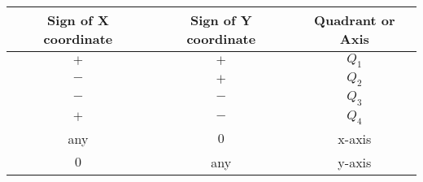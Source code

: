 \begin{tabular}[12pt]{ |c| c| c|} 
    \hline
    {Sign of X coordinate} & {Sign of Y coordinate} & {Quadrant or Axis}\\ 
    \hline
    $ + $ & $ + $ & $ Q_1 $\\
    \hline 
    $ - $ & $ + $ & $ Q_2 $ \\
    \hline
    $ - $ & $ - $ & $ Q_3 $ \\
    \hline   
    $ + $ & $ - $ & $ Q_4 $\\
    \hline
    any  & $ 0 $ & x-axis\\
    \hline
    $ 0 $ &  any  & y-axis\\
    \hline
    \end{tabular}